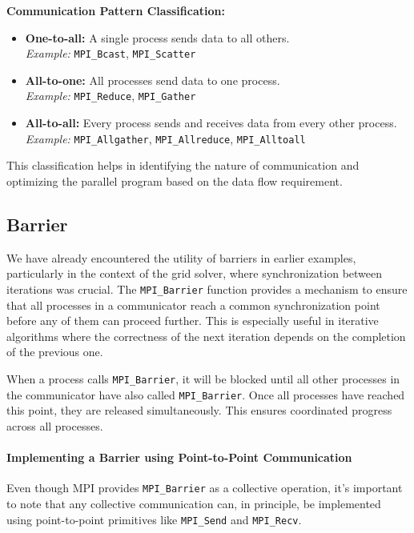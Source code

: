 \documentclass[12pt]{book}
\begin{document}
\textbf{Communication Pattern Classification:}
\begin{itemize}
    \item \textbf{One-to-all:} A single process sends data to all others. \\
        \textit{Example:} \texttt{MPI\_Bcast}, \texttt{MPI\_Scatter}
    \item \textbf{All-to-one:} All processes send data to one process. \\
        \textit{Example:} \texttt{MPI\_Reduce}, \texttt{MPI\_Gather}
    \item \textbf{All-to-all:} Every process sends and receives data from every other process. \\
        \textit{Example:} \texttt{MPI\_Allgather}, \texttt{MPI\_Allreduce}, \texttt{MPI\_Alltoall}
\end{itemize}

This classification helps in identifying the nature of communication and optimizing the parallel program based on the data flow requirement.

\subsection{Barrier}

We have already encountered the utility of barriers in earlier examples, particularly in the context of the grid solver, where synchronization between iterations was crucial. The \texttt{MPI\_Barrier} function provides a mechanism to ensure that all processes in a communicator reach a common synchronization point before any of them can proceed further. This is especially useful in iterative algorithms where the correctness of the next iteration depends on the completion of the previous one.
 
When a process calls \texttt{MPI\_Barrier}, it will be blocked until all other processes in the communicator have also called \texttt{MPI\_Barrier}. Once all processes have reached this point, they are released simultaneously. This ensures coordinated progress across all processes.

\paragraph{Implementing a Barrier using Point-to-Point Communication}  
Even though MPI provides \texttt{MPI\_Barrier} as a collective operation, it's important to note that any collective communication can, in principle, be implemented using point-to-point primitives like \texttt{MPI\_Send} and \texttt{MPI\_Recv}.
\end{document}
